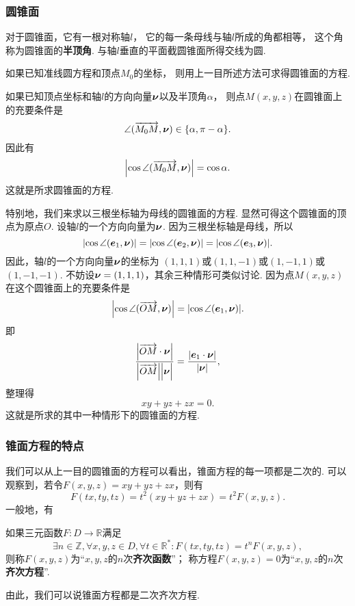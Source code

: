 \subsubsection{圆锥面}
对于圆锥面，它有一根对称轴\(l\)，
它的每一条母线与轴\(l\)所成的角都相等，
这个角称为圆锥面的\textbf{半顶角}.
与轴\(l\)垂直的平面截圆锥面所得交线为圆.

如果已知准线圆方程和顶点\(M_0\)的坐标，
则用上一目所述方法可求得圆锥面的方程.

如果已知顶点坐标和轴\(l\)的方向向量\(\boldsymbol{\nu}\)以及半顶角\(\alpha\)，
则点\(M(x,y,z)\)在圆锥面上的充要条件是\[
	\angle(\overrightarrow{M_0 M},\boldsymbol{\nu}) \in \{ \alpha, \pi - \alpha \}.
\]
因此有\begin{equation}
	\abs{\cos\angle(\overrightarrow{M_0 M},\boldsymbol{\nu})} = \cos\alpha.
\end{equation}
这就是所求圆锥面的方程.

特别地，我们来求以三根坐标轴为母线的圆锥面的方程.
显然可得这个圆锥面的顶点为原点\(O\).
设轴\(l\)的一个方向向量为\(\boldsymbol{\nu}\).
因为三根坐标轴是母线，所以\[
	\abs{\cos\angle(\boldsymbol{e}_1,\boldsymbol{\nu})}
	= \abs{\cos\angle(\boldsymbol{e}_2,\boldsymbol{\nu})}
	= \abs{\cos\angle(\boldsymbol{e}_3,\boldsymbol{\nu})}.
\]
因此，轴\(l\)的一个方向向量\(\boldsymbol{\nu}\)的坐标为
\((1,1,1)\)或\((1,1,-1)\)或\((1,-1,1)\)或\((1,-1,-1)\).
不妨设\(\boldsymbol{\nu}=(1,1,1)\)，其余三种情形可类似讨论.
因为点\(M(x,y,z)\)在这个圆锥面上的充要条件是\[
	\abs{\cos\angle(\overrightarrow{OM},\boldsymbol{\nu})}
	= \abs{\cos\angle(\boldsymbol{e}_1,\boldsymbol{\nu})}.
\]
即\[
	\frac{\abs{\vec{OM}\cdot\mat{\nu}}}{\abs{\vec{OM}}\abs{\mat{\nu}\vphantom{\vec{OM}}}}
	= \frac{\abs{\mat{e}_1\cdot\mat{\nu}}}{\abs{\mat{\nu}}},
\]
整理得\[
	xy+yz+zx=0.
\]
这就是所求的其中一种情形下的圆锥面的方程.

\subsubsection{锥面方程的特点}
我们可以从上一目的圆锥面的方程可以看出，锥面方程的每一项都是二次的.
可以观察到，若令\(F(x,y,z) = xy+yz+zx\)，则有\[
	F(tx,ty,tz) = t^2(xy+yz+zx)
	= t^2 F(x,y,z).
\]
一般地，有
\begin{definition}
如果三元函数\(F\colon D \to \mathbb{R}\)满足\[
	\exists n\in\mathbb{Z},
	\forall x,y,z \in D,
	\forall t\in\mathbb{R}^*:
	F(tx,ty,tz) = t^n F(x,y,z),
\]
则称\(F(x,y,z)\)为“\(x,y,z\)的\(n\)次\textbf{齐次函数}”；
称方程\(F(x,y,z)=0\)为“\(x,y,z\)的\(n\)次\textbf{齐次方程}”.
\end{definition}

由此，我们可以说锥面方程都是二次齐次方程.

